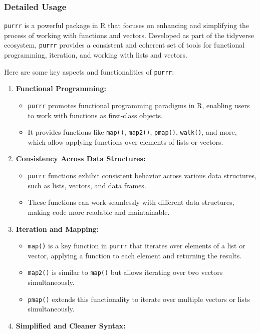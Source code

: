 \documentclass[
]{article}
\begin{document}
\hypertarget{detailed-usage}{%
\subsubsection{Detailed Usage}\label{detailed-usage}}

\texttt{purrr} is a powerful package in R that focuses on enhancing and
simplifying the process of working with functions and vectors. Developed
as part of the tidyverse ecosystem, \texttt{purrr} provides a consistent
and coherent set of tools for functional programming, iteration, and
working with lists and vectors.

Here are some key aspects and functionalities of \texttt{purrr}:

\begin{enumerate}
\def\labelenumi{\arabic{enumi}.}
\item
  \textbf{Functional Programming:}

  \begin{itemize}
  \item
    \texttt{purrr} promotes functional programming paradigms in R,
    enabling users to work with functions as first-class objects.
  \item
    It provides functions like \texttt{map()}, \texttt{map2()},
    \texttt{pmap()}, \texttt{walk()}, and more, which allow applying
    functions over elements of lists or vectors.
  \end{itemize}
\item
  \textbf{Consistency Across Data Structures:}

  \begin{itemize}
  \item
    \texttt{purrr} functions exhibit consistent behavior across various
    data structures, such as lists, vectors, and data frames.
  \item
    These functions can work seamlessly with different data structures,
    making code more readable and maintainable.
  \end{itemize}
\item
  \textbf{Iteration and Mapping:}

  \begin{itemize}
  \item
    \texttt{map()} is a key function in \texttt{purrr} that iterates
    over elements of a list or vector, applying a function to each
    element and returning the results.
  \item
    \texttt{map2()} is similar to \texttt{map()} but allows iterating
    over two vectors simultaneously.
  \item
    \texttt{pmap()} extends this functionality to iterate over multiple
    vectors or lists simultaneously.
  \end{itemize}
\item
  \textbf{Simplified and Cleaner Syntax:}


\end{enumerate}
\end{document}
